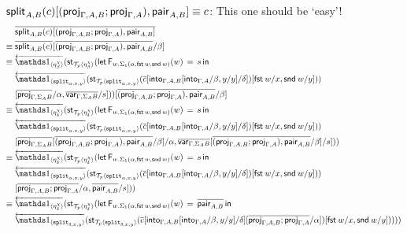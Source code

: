 \documentclass[10pt]{article}
\theoremstyle{definition}
\newcommand\dsd[1]{\ensuremath{\mathsf{#1}}}
\newcommand{\app}[2]{\ensuremath{#1 \: #2}}
\newcommand{\fst}[1]{\app{\dsd{fst}}{#1}}
\newcommand{\snd}[1]{\app{\dsd{snd}}{#1}}
\newcommand{\rewrite}[2]{\overleftarrow{#1}(#2)}
\newcommand\StI[2]{\ensuremath{\mathsf{st}_{#1}(#2)}}
\newcommand\FEs[4]{\ensuremath{\mathsf{let} \, \mathsf{F}_{#1}(#3) \, = \, {#2} \, \mathsf{in} \, #4}}
\newcommand\ApEl[2]{\mathcal{T}_{#1}\langle#2\rangle}
\begin{document}
\begin{enumerate}[style = multiline, labelwidth = 80pt]
\item[{$\mathsf{split}_{A,B}(c)\allowbreak[(\mathsf{proj}_{\Gamma, A, B};\mathsf{proj}_{\Gamma, A}), \allowbreak\mathsf{pair}_{A,B}] \equiv c$}:] 
This one should be `easy'!
\begin{align*}
&\upstairs{\qsplit{A,B}(c)[(\proj{\Gamma, A, B};\proj{\Gamma, A}),\qpair{A,B}]} \\
\equiv{} &\upstairs{\qsplit{A,B}(c)}[\upstairs{(\proj{\Gamma, A, B};\proj{\Gamma, A}),\qpair{A,B}}/\beta] \\
\equiv{} &\rewrite{\One_{\langle \eta^\chi_\beta \rangle}}{\StI{\ApEl{p}{\eta^\chi_\beta}}{\FEs{w. \Sigma_1(\alpha,\fst w, \snd w)}{s}{w}{\\&\rewrite{\ApOne{\tsplit{\alpha,x,y}}}{\StI{\ApEl{p}{\tsplit{\alpha,x,y}}}{\upstairs{c}[\into{\Gamma, A, B}[\into{\Gamma, A}/\beta, y/y] /\delta]}[\fst w/x, \snd w/y]}})\\&[\upstairs{\proj{\Gamma, \Sigma_A B}}/\alpha, \upstairs{\qvar{\Gamma, \Sigma_A B}}/s]}}[\upstairs{(\proj{\Gamma, A, B};\proj{\Gamma, A}),\qpair{A,B}}/\beta] \\
\equiv{} &\rewrite{\One_{\langle \eta^\chi_\delta \rangle}}{\StI{\ApEl{p}{\eta^\chi_\delta}}{\FEs{w. \Sigma_1(\alpha,\fst w, \snd w)}{s}{w}{\\&\rewrite{\ApOne{\tsplit{\alpha,x,y}}}{\StI{\ApEl{p}{\tsplit{\alpha,x,y}}}{\upstairs{c}[\into{\Gamma, A, B}[\into{\Gamma, A}/\beta, y/y] /\delta]}[\fst w/x, \snd w/y]}})\\&[\upstairs{\proj{\Gamma, \Sigma_A B}}[\upstairs{(\proj{\Gamma, A, B};\proj{\Gamma, A}),\qpair{A,B}}/\beta]/\alpha, \upstairs{\qvar{\Gamma, \Sigma_A B}}[\upstairs{(\proj{\Gamma, A, B};\proj{\Gamma, A}),\qpair{A,B}}/\beta]/s]}} \\
\equiv{} &\rewrite{\One_{\langle \eta^\chi_\delta \rangle}}{\StI{\ApEl{p}{\eta^\chi_\delta}}{\FEs{w. \Sigma_1(\alpha,\fst w, \snd w)}{s}{w}{\\&\rewrite{\ApOne{\tsplit{\alpha,x,y}}}{\StI{\ApEl{p}{\tsplit{\alpha,x,y}}}{\upstairs{c}[\into{\Gamma, A, B}[\into{\Gamma, A}/\beta, y/y] /\delta]}[\fst w/x, \snd w/y]}})\\&[\upstairs{\proj{\Gamma, A, B};\proj{\Gamma, A}}/\alpha, \upstairs{\qpair{A,B}}/s]}} \\
\equiv{} &\rewrite{\One_{\langle \eta^\chi_\delta \rangle}}{\StI{\ApEl{p}{\eta^\chi_\delta}}{\FEs{w. \Sigma_1(\alpha,\fst w, \snd w)}{\upstairs{\qpair{A,B}}}{w}{\\&\rewrite{\ApOne{\tsplit{\delta,x,y}}}{\StI{\ApEl{p}{\tsplit{\delta,x,y}}}{\upstairs{c}[\into{\Gamma, A, B}[\into{\Gamma, A}/\beta, y/y] /\delta][\upstairs{\proj{\Gamma, A, B};\proj{\Gamma, A}}/\alpha]}[\fst w/x, \snd w/y]}})}} \\

\end{align*}
\end{enumerate}
\end{document}
